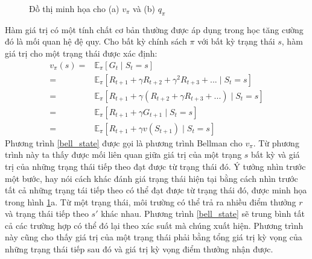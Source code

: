 \begin{figure}
		\caption[Đồ thị minh họa cho hàm giá trị]{Đồ thị minh họa cho (a) $v_{\pi}$ và (b) $q_{\pi}$}
		\label{backup_diagram}
	\end{figure}
	
	Hàm giá trị có một tính chất cơ bản thường được áp dụng trong học tăng cường đó là mối quan hệ đệ quy. Cho bất kỳ chính sách $\pi$ với bất kỳ trạng thái $s$, hàm giá trị cho một trạng thái được xác định:	
	\begin{align}
		\label{bell_state}
			v_{\pi}(s) = {}& \mathbb{E}_{\pi}\left [\mathit{G}_t \mid \mathit{S}_{t} = s\right ] \nonumber \\
			= {}& \mathbb{E}_{\pi}\left [ \mathit{R}_{t+1} + \gamma \mathit{R}_{t+2} + \gamma^{2} \mathit{R}_{t+3} + ... \mid \mathit{S}_t = s  \right ] \nonumber \\
			= {}& \mathbb{E}_{\pi}\left [ \mathit{R}_{t+1} + \gamma( {R}_{t+2} + \gamma \mathit{R}_{t+3} + ...) \mid \mathit{S}_t = s  \right ] \nonumber \\
			= {}& \mathbb{E}_{\pi}\left [ \mathit{R}_{t+1} + \gamma\mathit{G}_{t + 1} \mid \mathit{S}_t = s  \right ] \nonumber \\
			= {}& \mathbb{E}_{\pi}\left [ \mathit{R}_{t+1} + \gamma v(\mathit{S}_{t+1}) \mid \mathit{S}_t = s  \right ]
	\end{align}	
	Phương trình \ref{bell_state} được gọi là phương trình Bellman cho $v_{\pi}$. Từ phương trình này ta thấy được mối liên quan giữa giá trị của một trạng $s$ bất kỳ và giá trị của những trạng thái tiếp theo đạt được từ trạng thái đó. Ý tưởng nhìn trước một bước, hay nói cách khác đánh giá trạng thái hiện tại bằng cách nhìn trước tất cả những trạng tái tiếp theo có thể đạt được từ trạng thái đó, được minh họa trong hình \ref{backup_diagram}a. Từ một trạng thái, môi trường có thể trả ra nhiều điểm thưởng $r$ và trạng thái tiếp theo $s'$ khác nhau. Phương trình \ref{bell_state} sẽ trung bình tất cả các trường hợp có thể đó lại theo xác suất mà chúng xuất hiện. Phương trình này cũng cho thấy giá trị của một trạng thái phải bằng tổng giá trị kỳ vọng của những trạng thái tiếp sau đó và giá trị kỳ vọng điểm thưởng nhận được.
	
